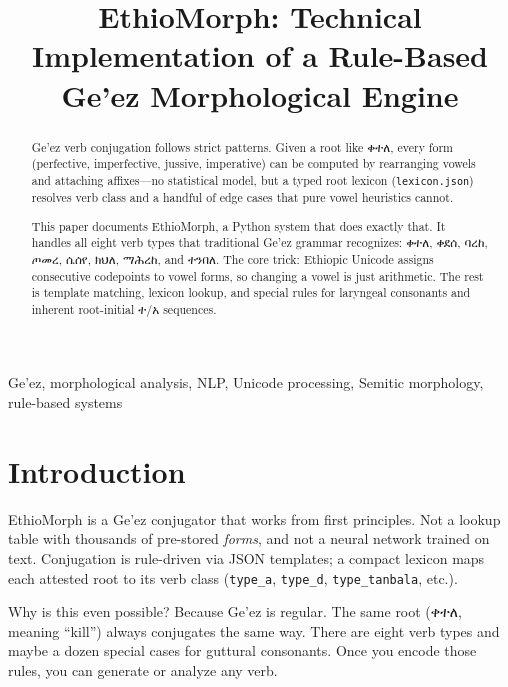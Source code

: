 \documentclass[conference]{IEEEtran}
\newcommand{\geez}[1]{{\ethiopicfont #1}}
\begin{document}
\title{EthioMorph: Technical Implementation of a Rule-Based Ge'ez Morphological Engine}

\author{
}

\maketitle

\begin{abstract}
Ge'ez verb conjugation follows strict patterns. Given a root like \geez{ቀተለ}, every form (perfective, imperfective, jussive, imperative) can be computed by rearranging vowels and attaching affixes---no statistical model, but a typed root lexicon (\texttt{lexicon.json}) resolves verb class and a handful of edge cases that pure vowel heuristics cannot.

This paper documents EthioMorph, a Python system that does exactly that. It handles all eight verb types that traditional Ge'ez grammar recognizes: \geez{ቀተለ}, \geez{ቀደሰ}, \geez{ባረከ}, \geez{ጦመረ}, \geez{ሴሰየ}, \geez{ክህለ}, \geez{ማሕረከ}, and \geez{ተንበለ}. The core trick: Ethiopic Unicode assigns consecutive codepoints to vowel forms, so changing a vowel is just arithmetic. The rest is template matching, lexicon lookup, and special rules for laryngeal consonants and inherent root-initial \geez{ተ}/\geez{አ} sequences.
\end{abstract}

\begin{IEEEkeywords}
Ge'ez, morphological analysis, NLP, Unicode processing, Semitic morphology, rule-based systems
\end{IEEEkeywords}

\section{Introduction}

EthioMorph is a Ge'ez conjugator that works from first principles. Not a lookup table with thousands of pre-stored \emph{forms}, and not a neural network trained on text. Conjugation is rule-driven via JSON templates; a compact lexicon maps each attested root to its verb class (\texttt{type\_a}, \texttt{type\_d}, \texttt{type\_tanbala}, etc.).

Why is this even possible? Because Ge'ez is regular. The same root (\geez{ቀተለ}, meaning ``kill'') always conjugates the same way. There are eight verb types and maybe a dozen special cases for guttural consonants. Once you encode those rules, you can generate or analyze any verb.
\end{document}

